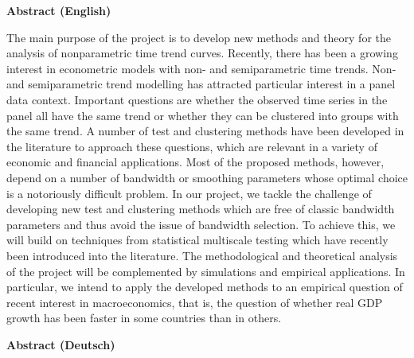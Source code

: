 \documentclass[a4paper,12pt]{article}
\begin{document}
\begin{center}
{\large \textbf{Abstract (English)}} 
\end{center}


The main purpose of the project is to develop new methods and theory for the analysis
of nonparametric time trend curves. Recently, there has been a growing interest in econometric models with non- and semiparametric time trends. 
Non- and semiparametric trend modelling has attracted particular interest in a panel data context. 
Important questions are whether the observed time series in the panel all have the same trend or whether they can be clustered into groups with the same trend. A number of test and clustering methods have been developed in the literature to approach these questions, which are relevant in a variety of economic and financial applications. Most of the proposed methods, however, depend on a number of bandwidth or smoothing parameters whose optimal choice is a notoriously difficult problem. In our project, we tackle the challenge of developing new test and clustering methods which are free of classic bandwidth para\-meters and thus avoid the issue of bandwidth selection. To achieve this, we will build on techniques from statistical multiscale testing which have recently been introduced into the literature. The methodological and theoretical analysis of the project will be complemented by simulations and empirical applications. In particular, we intend to apply the developed methods to an empirical question of recent interest in macroeconomics, that is, the question of whether real GDP growth has been faster in some countries than in others. 
\vspace{5pt}


\begin{center}
{\large \textbf{Abstract (Deutsch)}} 
\end{center}
\end{document}
